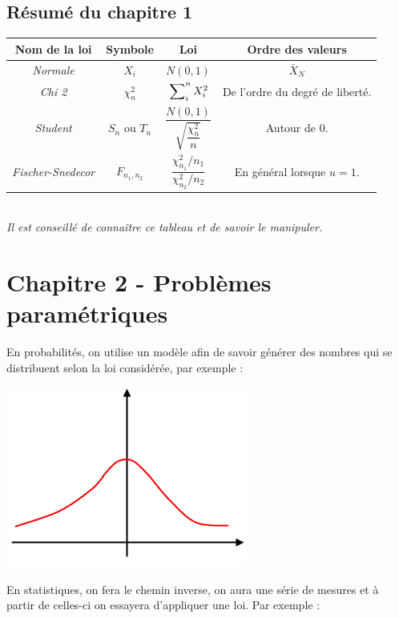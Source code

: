 \documentclass{article}
\begin{document}
\subsection{Résumé du chapitre 1}

\begin{tabular}{|*{4}{c|}}
\hline
\textbf{Nom de la loi} & \textbf{Symbole} & \textbf{Loi} & \textbf{Ordre des valeurs} \\
\hline
\textit{Normale} & $X_i$ & $N(0,1)$ & $\bar{X}_N$\\
\hline
\textit{Chi 2} & $\chi^2_n$ & $\sideset{}{_i^n}\sum{X_i^2}$ & De l'ordre du degré de liberté. \\
\hline
\textit{Student} & $S_n$ ou $T_n$ & $\dfrac{N(0,1)}{\sqrt{\dfrac{\chi_n^2}{n}}}$ & Autour de 0. \\
\hline
\textit{Fischer-Snedecor} & $F_{n_1,n_2}$ & $\dfrac{\chi^2_{n_1} / n_1}{\chi^2_{n_2} / n_2}$ & En général lorsque $u=1$. \\
\hline
\end{tabular} \\

\textit{Il est conseillé de connaître ce tableau et de savoir le manipuler.}

\section{Chapitre 2 - Problèmes paramétriques}

En probabilités, on utilise un modèle afin de savoir générer des nombres qui se distribuent selon la loi considérée, par 
exemple : 

\includegraphics{Figure2-1.png}

En statistiques, on fera le chemin inverse, on aura une série de mesures et à partir de celles-ci on essayera d'appliquer
une loi. Par exemple : \\
\end{document}
